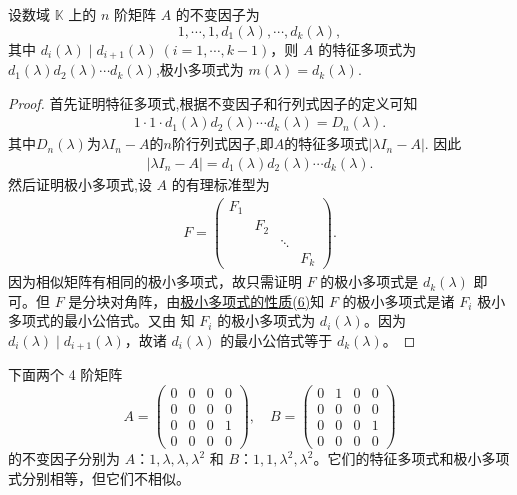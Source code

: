 \documentclass[../../main.tex]{subfiles}
\begin{document}
\begin{theorem}\label{theorem:极小多项式与不变因子的关系}
设数域 $\mathbb{K}$ 上的 $n$ 阶矩阵 $A$ 的不变因子为
\[
1,\cdots,1,d_1(\lambda),\cdots,d_k(\lambda),
\]
其中 $d_i(\lambda)\mid d_{i + 1}(\lambda)\ (i = 1,\cdots,k - 1)$，则 $A$ 的特征多项式为$d_1(\lambda)d_2(\lambda)\cdots d_k(\lambda)$,极小多项式为 $m(\lambda)=d_k(\lambda)$.
\end{theorem}
\begin{proof}
首先证明特征多项式,根据不变因子和行列式因子的定义可知
\begin{align*}
1\cdot 1\cdot d_1(\lambda)d_2(\lambda)\cdots d_k(\lambda)=D_n(\lambda).
\end{align*}
其中$D_n(\lambda)$为$\lambda I_n-A$的$n$阶行列式因子,即$A$的特征多项式$|\lambda I_n-A|$.
因此
\begin{align*}
|\lambda I_n-A|=d_1(\lambda)d_2(\lambda)\cdots d_k(\lambda).
\end{align*}
然后证明极小多项式,设 $A$ 的有理标准型为
\begin{align*}
F = \begin{pmatrix}
F_1 & & & \\
& F_2 & & \\
& & \ddots & \\
& & & F_k
\end{pmatrix}.
\end{align*}
因为相似矩阵有相同的极小多项式，故只需证明 $F$ 的极小多项式是 $d_k(\lambda)$ 即可。但 $F$ 是分块对角阵，由\hyperref[proposition:极小多项式的性质]{极小多项式的性质(6)}知 $F$ 的极小多项式是诸 $F_i$ 极小多项式的最小公倍式。又由 知 $F_i$ 的极小多项式为 $d_i(\lambda)$。因为 $d_i(\lambda)\mid d_{i + 1}(\lambda)$，故诸 $d_i(\lambda)$ 的最小公倍式等于 $d_k(\lambda)$。
\end{proof}

\begin{example}
下面两个 4 阶矩阵
\[
A = \begin{pmatrix}
0 & 0 & 0 & 0 \\
0 & 0 & 0 & 0 \\
0 & 0 & 0 & 1 \\
0 & 0 & 0 & 0
\end{pmatrix}, \quad
B = \begin{pmatrix}
0 & 1 & 0 & 0 \\
0 & 0 & 0 & 0 \\
0 & 0 & 0 & 1 \\
0 & 0 & 0 & 0
\end{pmatrix}
\]
的不变因子分别为 $A$：$1,\lambda,\lambda,\lambda^2$ 和 $B$：$1,1,\lambda^2,\lambda^2$。它们的特征多项式和极小多项式分别相等，但它们不相似。 
\end{example}
\end{document}
